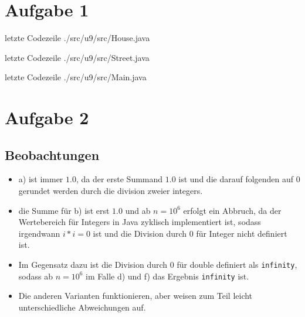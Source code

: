 
\newcommand{\dozent}{Prof. Dr. Claudia Müller-Birn, Barry Linnert}					%
\newcommand{\tutor}{Thierry Meurers}						%
\newcommand{\tutoriumNo}{10}				%
\newcommand{\ubungNo}{09}									%
\newcommand{\veranstaltung}{Objektorientierte Programmierung}	%
\newcommand{\semester}{SoSe 17}						%
\newcommand{\studenten}{Stefaan Hessmann, Jaap Pedersen, Mark Niehues}			%




\section{Aufgabe 1}
 letzte Codezeile
{./src/u9/src/House.java}


 letzte Codezeile
{./src/u9/src/Street.java}

 letzte Codezeile
{./src/u9/src/Main.java}

\section{Aufgabe 2}

\subsection{Beobachtungen}
\begin{itemize}
\item a) ist immer $1.0$, da der erste Summand $1.0$ ist und die darauf folgenden auf 0 gerundet werden durch die division zweier integers.
\item die Summe für b) ist erst $1.0$ und ab $n = 10^6$ erfolgt ein Abbruch, da der Wertebereich für Integers in Java zyklisch implementiert ist, sodass irgendwann $i*i=0$ ist und die Division durch $0$ für Integer nicht definiert ist.
\item Im Gegensatz dazu ist die Division durch $0$ für double definiert als \texttt{infinity}, sodass ab $n = 10^6$ im Falle d) und f) das Ergebnis \texttt{infinity} ist.
\item Die anderen Varianten funktionieren, aber weisen zum Teil leicht unterschiedliche Abweichungen auf.
\end{itemize}

